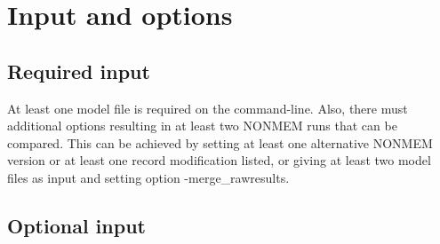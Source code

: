 \section{Input and options}

\subsection{Required input}
At least one model file is required on the command-line. 
Also, there must additional options resulting in at least two NONMEM runs that can be compared. This can be
achieved by setting at least one alternative NONMEM version or at least one record modification listed,
or giving at least two model files as input and setting option -merge\_rawresults. 

\subsection{Optional input}

